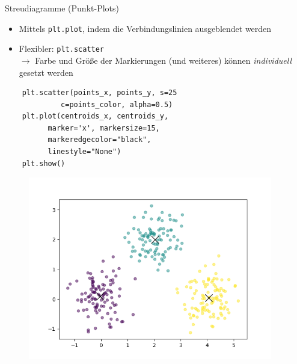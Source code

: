 \documentclass[utf8, smaller, c]{beamer}
\renewcommand{\tt}[1]{{\texttt{#1}}}
\begin{document}
\begin{frame}[fragile]{Streudiagramme (Punkt-Plots)}
	\begin{itemize}
		\item Mittels \tt{plt.plot}, indem die Verbindungslinien ausgeblendet werden
		\item Flexibler: \tt{plt.scatter}\\ $\rightarrow$ Farbe und Größe der Markierungen (und weiteres) können \textit{individuell} gesetzt werden
	\end{itemize}
	\vspace{-2mm}
	\begin{minipage}{0.45\textwidth}
		\begin{lstlisting}
	plt.scatter(points_x, points_y, s=25
	         c=points_color, alpha=0.5)
	plt.plot(centroids_x, centroids_y,
	      marker='x', markersize=15,
	      markeredgecolor="black",
	      linestyle="None")
	plt.show()
		\end{lstlisting}
	\end{minipage}
	\begin{minipage}{0.5\textwidth}
		\begin{figure}
			\includegraphics[width=0.95\textwidth]{pics/scatter}
		\end{figure}
	\end{minipage}
\end{frame}
\end{document}

